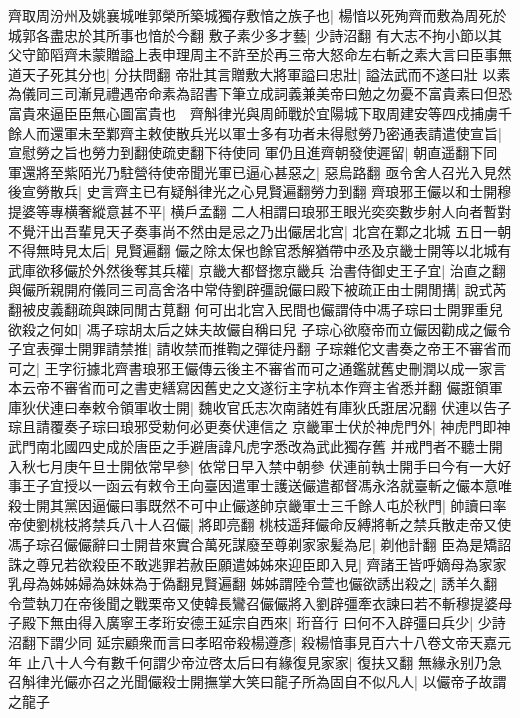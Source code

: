 齊取周汾州及姚襄城唯郭榮所築城獨存敷愔之族子也|{
	楊愔以死殉齊而敷為周死於城郭各盡忠於其所事也愔於今翻}
敷子素少多才藝|{
	少詩沼翻}
有大志不拘小節以其父守節䧟齊未蒙贈謚上表申理周主不許至於再三帝大怒命左右斬之素大言曰臣事無道天子死其分也|{
	分扶問翻}
帝壯其言贈敷大將軍謚曰忠壯|{
	謚法武而不遂曰壯}
以素為儀同三司漸見禮遇帝命素為詔書下筆立成詞義兼美帝曰勉之勿憂不富貴素曰但恐富貴來逼臣臣無心圖富貴也　齊斛律光與周師戰於宜陽城下取周建安等四戍捕虜千餘人而還軍未至鄴齊主敕使散兵光以軍士多有功者未得慰勞乃密通表請遣使宣旨|{
	宣慰勞之旨也勞力到翻使疏吏翻下待使同}
軍仍且進齊朝發使遲留|{
	朝直遥翻下同}
軍還將至紫陌光乃駐營待使帝聞光軍已逼心甚惡之|{
	惡烏路翻}
亟令舍人召光入見然後宣勞散兵|{
	史言齊主已有疑斛律光之心見賢遍翻勞力到翻}
齊琅邪王儼以和士開穆提婆等專横奢縱意甚不平|{
	横戶孟翻}
二人相謂曰琅邪王眼光奕奕數步射人向者暫對不覺汗出吾輩見天子奏事尚不然由是忌之乃出儼居北宫|{
	北宫在鄴之北城}
五日一朝不得無時見太后|{
	見賢遍翻}
儼之除太保也餘官悉解猶帶中丞及京畿士開等以北城有武庫欲移儼於外然後奪其兵權|{
	京畿大都督揔京畿兵}
治書侍御史王子宜|{
	治直之翻}
與儼所親開府儀同三司高舍洛中常侍劉辟彊說儼曰殿下被疏正由士開閒搆|{
	說式芮翻被皮義翻疏與踈同閒古莧翻}
何可出北宫入民間也儼謂侍中馮子琮曰士開罪重兒欲殺之何如|{
	馮子琮胡太后之妹夫故儼自稱曰兒}
子琮心欲廢帝而立儼因勸成之儼令子宜表彈士開罪請禁推|{
	請收禁而推鞫之彈徒丹翻}
子琮雜佗文書奏之帝王不審省而可之|{
	王字衍據北齊書琅邪王儼傳云後主不審省而可之通鑑就舊史刪潤以成一家言本云帝不審省而可之書吏繕寫因舊史之文遂衍主字杭本作齊主省悉并翻}
儼誑領軍庫狄伏連曰奉敕令領軍收士開|{
	魏收官氏志次南諸姓有庫狄氏誑居况翻}
伏連以告子琮且請覆奏子琮曰琅邪受勅何必更奏伏連信之京畿軍士伏於神虎門外|{
	神虎門即神武門南北國四史成於唐臣之手避唐諱凡虎字悉改為武此獨存舊}
并戒門者不聽士開入秋七月庚午旦士開依常早參|{
	依常日早入禁中朝參}
伏連前執士開手曰今有一大好事王子宜授以一函云有敕令王向臺因遣軍士護送儼遣都督馮永洛就臺斬之儼本意唯殺士開其黨因逼儼曰事既然不可中止儼遂帥京畿軍士三千餘人屯於秋門|{
	帥讀曰率}
帝使劉桃枝將禁兵八十人召儼|{
	將即亮翻}
桃枝遥拜儼命反縛將斬之禁兵散走帝又使馮子琮召儼儼辭曰士開昔來實合萬死謀廢至尊剃家家髪為尼|{
	剃他計翻}
臣為是矯詔誅之尊兄若欲殺臣不敢逃罪若赦臣願遣姊姊來迎臣即入見|{
	齊諸王皆呼嫡母為家家乳母為姊姊婦為妹妹為于偽翻見賢遍翻}
姊姊謂陸令萱也儼欲誘出殺之|{
	誘羊久翻}
令萱執刀在帝後聞之戰栗帝又使韓長鸞召儼儼將入劉辟彊牽衣諫曰若不斬穆提婆母子殿下無由得入廣寧王孝珩安德王延宗自西來|{
	珩音行}
曰何不入辟彊曰兵少|{
	少詩沼翻下謂少同}
延宗顧衆而言曰孝昭帝殺楊遵彥|{
	殺楊愔事見百六十八卷文帝天嘉元年}
止八十人今有數千何謂少帝泣啓太后曰有緣復見家家|{
	復扶又翻}
無緣永别乃急召斛律光儼亦召之光聞儼殺士開撫掌大笑曰龍子所為固自不似凡人|{
	以儼帝子故謂之龍子}
